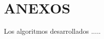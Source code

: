\documentclass[../main.tex]{subfiles}
\begin{document}
\chapter*{\center \Large ANEXOS} 

\par Los algoritmos desarrollados .....
\end{document}
